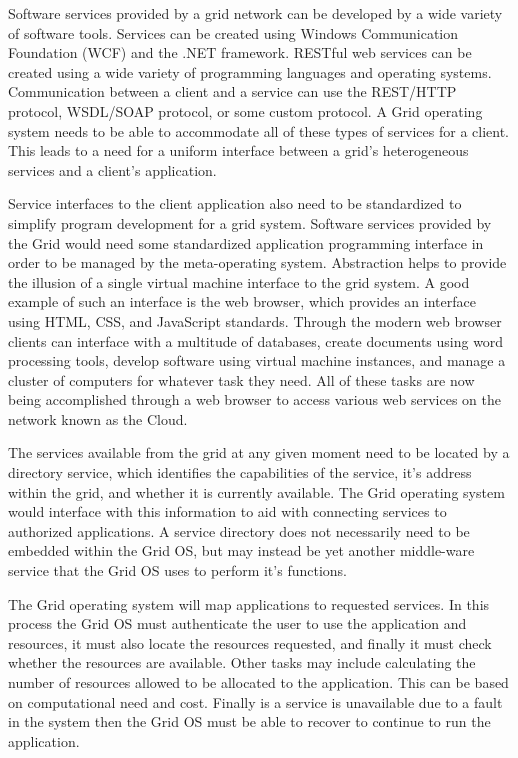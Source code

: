 \documentclass[conference]{IEEEtran}
\begin{document}
Software services provided by a grid network can be developed by a wide variety of software tools. Services can be created using Windows Communication Foundation (WCF) and the .NET framework. RESTful web services can be created using a wide variety of programming languages and operating systems. Communication between a client and a service can use the REST/HTTP protocol, WSDL/SOAP protocol, or some custom protocol. \cite{cse598book} A Grid operating system needs to be able to accommodate all of these types of services for a client. This leads to a need for a uniform interface between a grid's heterogeneous services and a client's application. 

Service interfaces to the client application also need to be standardized to simplify program development for a grid system. Software services provided by the Grid would need some standardized application programming interface in order to be managed by the meta-operating system. Abstraction helps to provide the illusion of a single virtual machine interface to the grid system. A good example of such an interface is the web browser, which provides an interface using HTML, CSS, and JavaScript standards. Through the modern web browser clients can interface with a multitude of databases, create documents using word processing tools, develop software using virtual machine instances, and manage a cluster of computers for whatever task they need. All of these tasks are now being accomplished through a web browser to access various web services on the network known as the Cloud. 

The services available from the grid at any given moment need to be located by a directory service, which identifies the capabilities of the service, it's address within the grid, and whether it is currently available. The Grid operating system would interface with this information to aid with connecting services to authorized applications. A service directory does not necessarily need to be embedded within the Grid OS, but may instead be yet another middle-ware service that the Grid OS uses to perform it's functions.  

The Grid operating system will map applications to requested services. In this process the Grid OS must authenticate the user to use the application and resources, it must also locate the resources requested, and finally it must check whether the resources are available. Other tasks may include calculating the number of resources allowed to be allocated to the application. This can be based on computational need and cost. Finally is a service is unavailable due to a fault in the system then the Grid OS must be able to recover to continue to run the application. 
\end{document}
